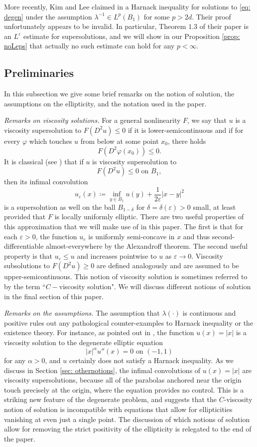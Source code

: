\documentclass[reqno]{amsart}
\numberwithin{equation}{section}
\numberwithin{equation}{section}
\newcommand{\eps}{\varepsilon}
\newcommand{\vphi}{\varphi}
\begin{document}
More recently, Kim and Lee claimed in \cite{KimLee2025} a Harnack inequality for solutions to \eqref{eq: degen} under the assumption $\lambda^{-1}\in L^p(B_1)$ for some $p>2d$. Their proof unfortunately appears to be invalid. In particular, Theorem $1.3$ of their paper is an $L^\eps$ estimate for supersolutions, and we will show in our Proposition \ref{prop: noLeps} that actually no such estimate can hold for any $p<\infty$.

\subsection{Preliminaries}
In this subsection we give some brief remarks on the notion of solution, the assumptions on the ellipticity, and the notation used in the paper. \\\par
\textit{Remarks on viscosity solutions.}
For a general nonlinearity $F$, we say that $u$ is a viscosity supersolution to $F(D^2u)\le 0$ if it is lower-semicontinuous and if for every $\vphi$ which touches $u$ from below at some point $x_0$, there holds 
$$F(D^2\vphi(x_0))\le 0.$$
It is classical (see \cite{CaffarelliCabre1995}) that if $u$ is viscosity supersolution to 
$$F(D^2u) \le 0 \text{ on } B_1,$$
then its infimal convolution
$$u_\eps(x) \coloneqq \inf_{y \in B_1} u(y) + \frac{1}{2\eps}|x-y|^2$$
is a supersolution as well on the ball $B_{1-\delta}$ for $\delta= \delta(\eps)>0$ small, at least provided that $F$ is locally uniformly elliptic. There are two useful properties of this approximation that we will make use of in this paper. The first is that for each $\eps>0$, the function $u_\eps$ is uniformly semi-concave in $x$ and thus second-differentiable almost-everywhere by the Alexandroff theorem. The second useful property is that $u_\eps \le u$ and increases pointwise to $u$ as $\eps \to 0$. Viscosity subsolutions to $F(D^2u) \ge 0$ are defined analogously and are assumed to be upper-semicontinuous. This notion of viscosity solution is sometimes referred to by the term  ``$C-$viscosity solution". We will discuss different notions of solution in the final section of this paper. 
\\\par
\textit{Remarks on the assumptions.}
The assumption that $\lambda(\cdot)$ is continuous and positive rules out any pathological counter-examples to Harnack inequality or the existence theory. For instance, as pointed out in \cite{KimLee2025}, the function $u(x) = |x|$ is a viscosity solution to the degenerate elliptic equation
$$|x|^\alpha u''(x) =0 \text{ on } (-1,1)$$
for any $\alpha>0$, and $u$ certainly does not satisfy a Harnack inequality. As we discuss in Section \ref{sec: othernotions}, the infimal convolutions of $u(x)=|x|$ are  viscosity supersolutions, because all of the parabolas anchored near the origin touch precisely at the origin, where the equation provides no control. This is a striking new feature of the degenerate problem, and suggests that the $C$-viscosity notion of solution is incompatible with equations that allow for ellipticities vanishing at even just a single point. The discussion of which notions of solution allow for removing the strict positivity of the ellipticity is relegated to the end of the paper.
\end{document}
